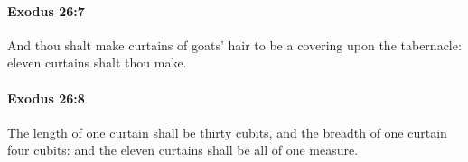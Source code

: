 		\paragraph{Exodus 26:7} %
			\label{EXODUS-26-7}

			And thou shalt make curtains of goats' hair to be a covering upon the tabernacle: eleven curtains shalt thou make.


		\paragraph{Exodus 26:8} %
			\label{EXODUS-26-8}

			The length of one curtain shall be thirty cubits, and the breadth of one curtain four cubits: and the eleven curtains shall be all of one measure.



